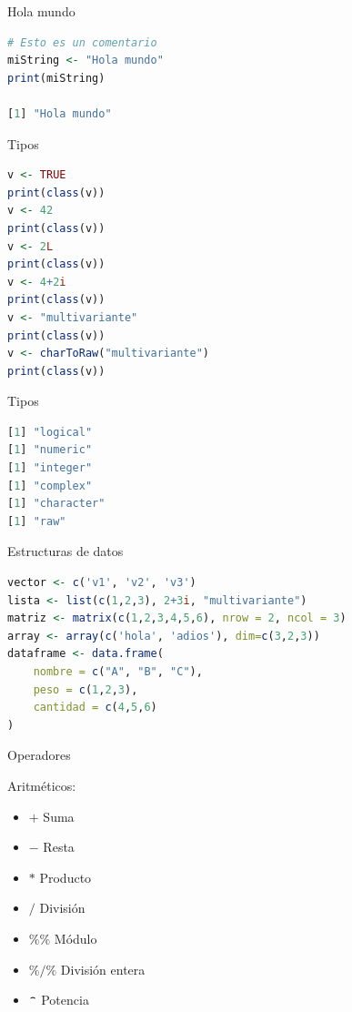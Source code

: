 \documentclass[xcolor=table]{beamer}
\begin{document}
\begin{frame}[fragile]{Hola mundo}
\begin{lstlisting}[language=R, basicstyle=\ttfamily]
# Esto es un comentario
miString <- "Hola mundo"
print(miString)

[1] "Hola mundo"
\end{lstlisting}

\end{frame}

\begin{frame}[fragile]{Tipos}
\begin{lstlisting}[language=R, basicstyle=\ttfamily]
v <- TRUE
print(class(v))
v <- 42
print(class(v))
v <- 2L
print(class(v))
v <- 4+2i
print(class(v))
v <- "multivariante"
print(class(v))
v <- charToRaw("multivariante")
print(class(v))

\end{lstlisting}
\end{frame}

\begin{frame}[fragile]{Tipos}
\begin{lstlisting}[language=R, basicstyle=\ttfamily]
[1] "logical"
[1] "numeric"
[1] "integer"
[1] "complex"
[1] "character"
[1] "raw"
\end{lstlisting}

\end{frame}

\begin{frame}[fragile]{Estructuras de datos}
\begin{lstlisting}[language=R, basicstyle=\ttfamily]
vector <- c('v1', 'v2', 'v3')
lista <- list(c(1,2,3), 2+3i, "multivariante")
matriz <- matrix(c(1,2,3,4,5,6), nrow = 2, ncol = 3)
array <- array(c('hola', 'adios'), dim=c(3,2,3))
dataframe <- data.frame(
    nombre = c("A", "B", "C"),
    peso = c(1,2,3),
    cantidad = c(4,5,6)
)
\end{lstlisting}

\end{frame}

\begin{frame}[fragile]{Operadores}

Aritméticos:

\begin{itemize}
\item $+$ Suma
\item $-$ Resta
\item $*$ Producto
\item $/$ División
\item $\%\%$ Módulo
\item $\%/\%$ División entera
\item $\verb|^|$ Potencia

\end{itemize}

\end{frame}
\end{document}
